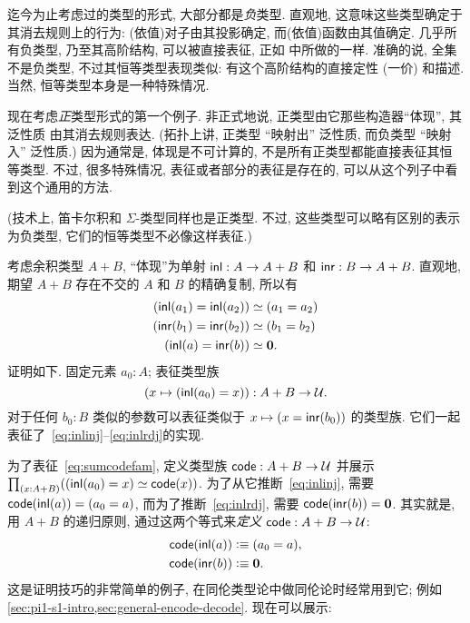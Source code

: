 %
%
迄今为止考虑过的类型的形式, 大部分都是\emph{负}类型.
%
%
直观地, 这意味这些类型确定于其消去规则上的行为: (依值)对子由其投影确定, 而(依值)函数由其值确定.
几乎所有负类型, 乃至其高阶结构, 可以被直接表征, 正如 中所做的一样.
准确的说, 全集不是负类型, 不过其恒等类型表现类似: 有这个高阶结构的直接定性 (一价) 和描述.
当然, 恒等类型本身是一种特殊情况.

现在考虑\emph{正}类型形式的第一个例子.
%
非正式地说, 正类型由它那些构造器``体现'', 其泛性质 由其消去规则表达.
(拓扑上讲, 正类型 ``映射出'' 泛性质, 而负类型 ``映射入'' 泛性质.)
因为通常是, 体现是不可计算的, 不是所有正类型都能直接表征其恒等类型.
不过, 很多特殊情况, 表征或者部分的表征是存在的, 可以从这个列子中看到这个通用的方法.

(技术上, 笛卡尔积和 $\Sigma$-类型同样也是正类型.
不过, 这些类型可以略有区别的表示为负类型, 它们的恒等类型不必像这样表征.)

考虑余积类型 $A+B$, ``体现''为单射 ${\mathsf{inl}}:A\to A+B$ 和 ${\mathsf{inr}}:B\to A+B$.
直观地, 期望 $A+B$ 存在不交的 $A$ 和 $B$ 的精确复制, 所以有
\begin{align}
{(\inl(a_1)=\inl(a_2))}
    &\eqvsym {(a_1=a_2)} \label{eq:inlinj}\\
    {(\inr(b_1)=\inr(b_2))}&\eqvsym {(b_1=b_2)}\\
    {(\inl(a)= \inr(b))} &\eqvsym {\emptyt}. \label{eq:inlrdj}
\end{align}
证明如下.
固定元素 $a_0:A$; 表征类型族
\begin{equation}
(x\mapsto (\inl(a_0)=x))
    : A+B \to \type.\label{eq:sumcodefam}
\end{equation}
对于任何 $b_0:B$ 类似的参数可以表征类似于 $x\mapsto (x = {\mathsf{inr}}(b_0))$ 的类型族.
它们一起表征了~\eqref{eq:inlinj}--\eqref{eq:inlrdj}的实现.

为了表征~\eqref{eq:sumcodefam}, 定义类型族 $\mathsf{code}:A+B\to\mathcal{U}$ 并展示 $\prd{x:A+B} (\eqv{(\inl(a_0)=x)}{\code(x)})$.
为了从它推断~\eqref{eq:inlinj}, 需要 $\mathsf{code}({\mathsf{inl}}(a)) = (a_0=a)$, 而为了推断~\eqref{eq:inlrdj}, 需要 $\mathsf{code} ({\mathsf{inr}}(b)) = \mathbf{0}$.
其实就是, 用 $A+B$ 的递归原则, 通过这两个等式来\emph{定义} $\mathsf{code}:A+B\to\mathcal{U}$:
\begin{align*}
    \mathsf{code}({\mathsf{inl}}(a)) &\vcentcolon\equiv (a_0=a),\\
    \mathsf{code}({\mathsf{inr}}(b)) &\vcentcolon\equiv \mathbf{0}.
\end{align*}
这是证明技巧的非常简单的例子, 在同伦类型论中做同伦论时经常用到它;
例如 \cref{sec:pi1-s1-intro,sec:general-encode-decode}.
%
现在可以展示:

